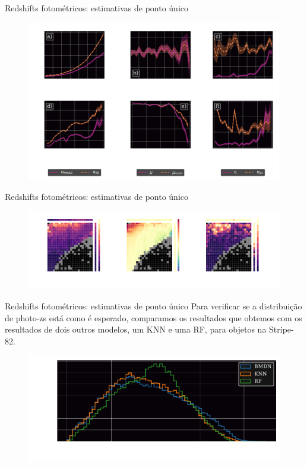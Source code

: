 \begin{frame}[c]{Redshifts fotométricos: estimativas de ponto único}
    \begin{figure}
        \centering
        \includegraphics[height=7cm]{script/images/results_spe_metrics.pdf}
    \end{figure}
\end{frame}

\begin{frame}[c]{Redshifts fotométricos: estimativas de ponto único}
    \begin{figure}
        \centering
        \includegraphics[width=\linewidth]{script/images/results_spe_metrics_2d.pdf}
    \end{figure}
\end{frame}

\begin{frame}[c]{Redshifts fotométricos: estimativas de ponto único}
    Para verificar se a distribuição de photo-zs está como é esperado, comparamos os resultados que obtemos com os resultados de dois outros modelos, um KNN e uma RF, para objetos na Stripe-82.

    \begin{figure}
        \centering
        \includegraphics[width=0.8\linewidth]{script/images/s82_redshifts.pdf}
    \end{figure}
\end{frame}

